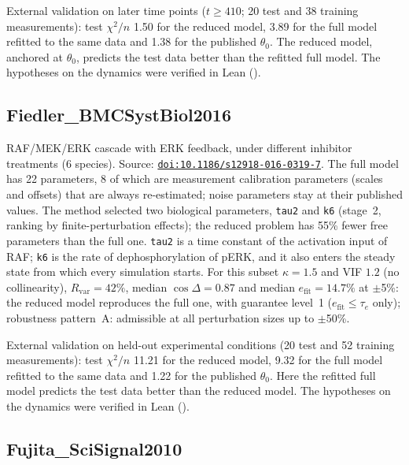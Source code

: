 External validation on later time points ($t\ge410$; 20 test and 38 training measurements): test $\chi^2/n$ 1.50 for the reduced model, 3.89 for the full model refitted to the same data and 1.38 for the published $\theta_0$. The reduced model, anchored at $\theta_0$, predicts the test data better than the refitted full model. The hypotheses on the dynamics were verified in Lean ().

\subsection*{Fiedler\_BMCSystBiol2016}

RAF/MEK/ERK cascade with ERK feedback, under different inhibitor treatments (6 species). Source: \href{https://doi.org/10.1186/s12918-016-0319-7}{\nolinkurl{doi:10.1186/s12918-016-0319-7}}. The full model has 22 parameters, 8 of which are measurement calibration parameters (scales and offsets) that are always re-estimated; noise parameters stay at their published values. The method selected two biological parameters, \texttt{tau2} and \texttt{k6} (stage~2, ranking by finite-perturbation effects); the reduced problem has 55\% fewer free parameters than the full one. \texttt{tau2} is a time constant of the activation input of RAF; \texttt{k6} is the rate of dephosphorylation of pERK, and it also enters the steady state from which every simulation starts. For this subset $\kappa=1.5$ and VIF $1.2$ (no collinearity), $R_{\mathrm{var}}=42\%$, median $\cos\Delta=0.87$ and median $e_{\mathrm{fit}}=14.7\%$ at $\pm$5\%: the reduced model reproduces the full one, with guarantee level~1 ($e_{\mathrm{fit}}\le\tau_e$ only); robustness pattern~A: admissible at all perturbation sizes up to $\pm$50\%.

External validation on held-out experimental conditions (20 test and 52 training measurements): test $\chi^2/n$ 11.21 for the reduced model, 9.32 for the full model refitted to the same data and 1.22 for the published $\theta_0$. Here the refitted full model predicts the test data better than the reduced model. The hypotheses on the dynamics were verified in Lean ().

\subsection*{Fujita\_SciSignal2010}

